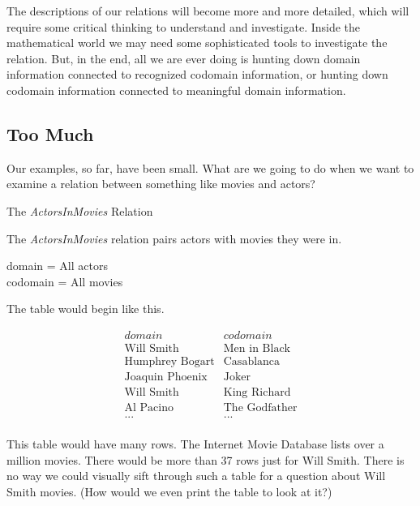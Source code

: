 \documentclass{ximera}
\begin{document}
The descriptions of our relations will become more and more detailed, which will require some critical thinking to understand and investigate. Inside the mathematical world we may need some sophisticated tools to investigate the relation.  But, in the end, all we are ever doing is hunting down domain information connected to recognized codomain information, or hunting down codomain information connected to meaningful domain information. 












\subsection*{Too Much}

Our examples, so far, have been small.  What are we going to do when we want to examine a relation between something like movies and actors?  


\begin{example} The \textit{ActorsInMovies} Relation

The \textit{ActorsInMovies} relation pairs actors with movies they were in.

domain = All actors \\
codomain = All movies

The table would begin like this.

\[
\begin{array}{l|l}
    domain      & codomain      \\ \hline
    \text{Will Smith}   &  \text{Men in Black} \\
    \text{Humphrey Bogart}   & \text{Casablanca} \\
    \text{Joaquin Phoenix}  &  \text{Joker} \\
    \text{Will Smith}  &  \text{King Richard} \\
    \text{Al Pacino} &  \text{The Godfather} \\ 
    \text{...} &  \text{...} \\ 
\end{array}
\]

\end{example} 


This table would have many rows. The Internet Movie Database lists over a million movies.  There would be more than 37 rows just for Will Smith. There is no way we could visually sift through such a table for a question about Will Smith movies. (How would we even print the table to look at it?)
\end{document}
